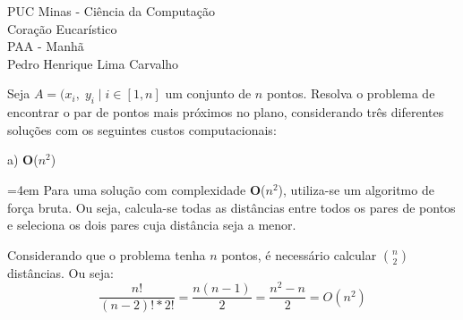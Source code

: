 \documentclass[10pt,a4paper]{letter}
\author{Pedro Henrique Lima Carvalho}
\newenvironment{resposta}{%
  \par%
  \medskip
  \leftskip=4em%
  \noindent\ignorespaces}{%
  \par\medskip}
\begin{document}
 
\noindent
PUC Minas - Ciência da Computação \\
Coração Eucarístico \\
PAA - Manhã \\
Pedro Henrique Lima Carvalho 
\par\noindent

Seja $A = {(x_{i},\; y_{i}\;|\; i \in [1, n]}$ um conjunto de $n$ pontos. Resolva o problema de encontrar o par de pontos mais próximos no plano, considerando três diferentes soluções com os seguintes custos computacionais:
\par 

a) \textbf{O}($n^{2}$)
\begin{resposta}
Para uma solução com complexidade \textbf{O}($n^{2}$), utiliza-se um algoritmo de força bruta. Ou seja, calcula-se todas as distâncias entre todos os pares de pontos e seleciona os dois pares cuja distância seja a menor. 
\par
Considerando que o problema tenha $n$ pontos, é necessário calcular $\binom{n}{2}$ distâncias. Ou seja:
\[\frac{n!}{(n-2)!*2!} = \frac{n(n-1)}{2} = \frac{n^2-n}{2} = O(n^2) \]
\end{resposta}
\end{document}
